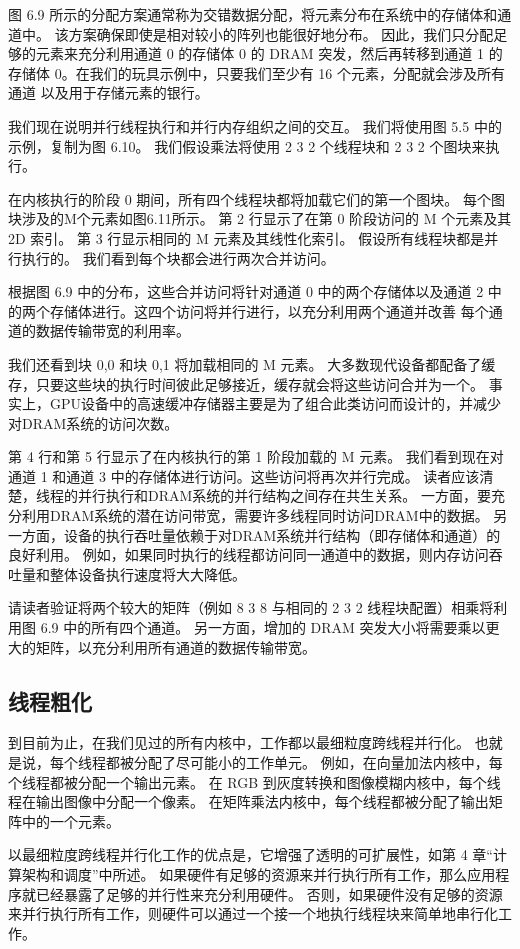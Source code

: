 图 6.9 所示的分配方案通常称为交错数据分配，将元素分布在系统中的存储体和通道中。 该方案确保即使是相对较小的阵列也能很好地分布。 因此，我们只分配足够的元素来充分利用通道 0 的存储体 0 的 DRAM 突发，然后再转移到通道 1 的存储体 0。在我们的玩具示例中，只要我们至少有 16 个元素，分配就会涉及所有通道 以及用于存储元素的银行。

我们现在说明并行线程执行和并行内存组织之间的交互。 我们将使用图 5.5 中的示例，复制为图 6.10。 我们假设乘法将使用 2 3 2 个线程块和 2 3 2 个图块来执行。

在内核执行的阶段 0 期间，所有四个线程块都将加载它们的第一个图块。 每个图块涉及的M个元素如图6.11所示。 第 2 行显示了在第 0 阶段访问的 M 个元素及其 2D 索引。 第 3 行显示相同的 M 元素及其线性化索引。 假设所有线程块都是并行执行的。 我们看到每个块都会进行两次合并访问。

根据图 6.9 中的分布，这些合并访问将针对通道 0 中的两个存储体以及通道 2 中的两个存储体进行。这四个访问将并行进行，以充分利用两个通道并改善 每个通道的数据传输带宽的利用率。

我们还看到块 0,0 和块 0,1 将加载相同的 M 元素。 大多数现代设备都配备了缓存，只要这些块的执行时间彼此足够接近，缓存就会将这些访问合并为一个。 事实上，GPU设备中的高速缓冲存储器主要是为了组合此类访问而设计的，并减少对DRAM系统的访问次数。

第 4 行和第 5 行显示了在内核执行的第 1 阶段加载的 M 元素。 我们看到现在对通道 1 和通道 3 中的存储体进行访问。这些访问将再次并行完成。 读者应该清楚，线程的并行执行和DRAM系统的并行结构之间存在共生关系。 一方面，要充分利用DRAM系统的潜在访问带宽，需要许多线程同时访问DRAM中的数据。 另一方面，设备的执行吞吐量依赖于对DRAM系统并行结构（即存储体和通道）的良好利用。 例如，如果同时执行的线程都访问同一通道中的数据，则内存访问吞吐量和整体设备执行速度将大大降低。

请读者验证将两个较大的矩阵（例如 8 3 8 与相同的 2 3 2 线程块配置）相乘将利用图 6.9 中的所有四个通道。 另一方面，增加的 DRAM 突发大小将需要乘以更大的矩阵，以充分利用所有通道的数据传输带宽。

\subsection{线程粗化}
到目前为止，在我们见过的所有内核中，工作都以最细粒度跨线程并行化。 也就是说，每个线程都被分配了尽可能小的工作单元。 例如，在向量加法内核中，每个线程都被分配一个输出元素。 在 RGB 到灰度转换和图像模糊内核中，每个线程在输出图像中分配一个像素。 在矩阵乘法内核中，每个线程都被分配了输出矩阵中的一个元素。

以最细粒度跨线程并行化工作的优点是，它增强了透明的可扩展性，如第 4 章“计算架构和调度”中所述。 如果硬件有足够的资源来并行执行所有工作，那么应用程序就已经暴露了足够的并行性来充分利用硬件。 否则，如果硬件没有足够的资源来并行执行所有工作，则硬件可以通过一个接一个地执行线程块来简单地串行化工作。

